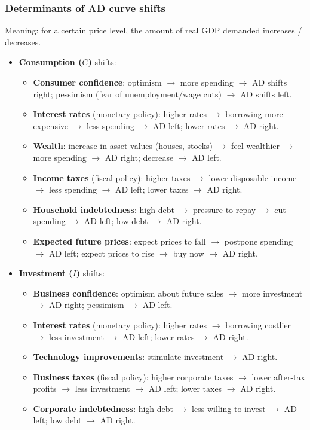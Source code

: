 \subsubsection*{Determinants of AD curve shifts}
Meaning: for a certain price level, the amount of real GDP demanded increases / decreases.
\begin{itemize}
  \item \textbf{Consumption ($C$)} shifts:
  \begin{itemize}
    \item \textbf{Consumer confidence}: optimism $\to$ more spending $\to$ AD shifts right; pessimism (fear of unemployment/wage cuts) $\to$ AD shifts left.
    \item \textbf{Interest rates} (monetary policy): higher rates $\to$ borrowing more expensive $\to$ less spending $\to$ AD left; lower rates $\to$ AD right.
    \item \textbf{Wealth}: increase in asset values (houses, stocks) $\to$ feel wealthier $\to$ more spending $\to$ AD right; decrease $\to$ AD left.
    \item \textbf{Income taxes} (fiscal policy): higher taxes $\to$ lower disposable income $\to$ less spending $\to$ AD left; lower taxes $\to$ AD right.
    \item \textbf{Household indebtedness}: high debt $\to$ pressure to repay $\to$ cut spending $\to$ AD left; low debt $\to$ AD right.
    \item \textbf{Expected future prices}: expect prices to fall $\to$ postpone spending $\to$ AD left; expect prices to rise $\to$ buy now $\to$ AD right.
  \end{itemize}
  \item \textbf{Investment ($I$)} shifts:
  \begin{itemize}
    \item \textbf{Business confidence}: optimism about future sales $\to$ more investment $\to$ AD right; pessimism $\to$ AD left.
    \item \textbf{Interest rates} (monetary policy): higher rates $\to$ borrowing costlier $\to$ less investment $\to$ AD left; lower rates $\to$ AD right.
    \item \textbf{Technology improvements}: stimulate investment $\to$ AD right.
    \item \textbf{Business taxes} (fiscal policy): higher corporate taxes $\to$ lower after-tax profits $\to$ less investment $\to$ AD left; lower taxes $\to$ AD right.
    \item \textbf{Corporate indebtedness}: high debt $\to$ less willing to invest $\to$ AD left; low debt $\to$ AD right.

\end{itemize}
\end{itemize}
